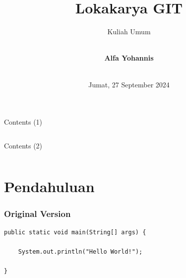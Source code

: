 \documentclass[aspectratio=169, table]{beamer}
\subtitle{Kuliah Umum}
\title{\LARGE{Lokakarya GIT}\\\vspace{10pt}}
\date[Serial]{\\\vspace{10pt}\scriptsize {Jumat, 27 September 2024}}
\author[Pradita]{\\\vspace{20pt}\small{\textbf{Alfa Yohannis}}}
\begin{document}
	
	\frame{\titlepage}
	
	\begin{frame}[fragile]{Contents (1)}
		\vspace{15pt}
		\begin{columns}[t]
			\begin{column}{.5\textwidth}
				\tableofcontents[sections={1-6}]
			\end{column}
			\begin{column}{.5\textwidth}
				\tableofcontents[sections={7-15}]
			\end{column}
		\end{columns}
	\end{frame}
	
	\begin{frame}[fragile]{Contents (2)}
		\vspace{15pt}
		\begin{columns}[t]
			\begin{column}{.5\textwidth}
				\tableofcontents[sections={16-24}]
			\end{column}
			\begin{column}{.5\textwidth}
				\tableofcontents[sections={25-50}]
			\end{column}
		\end{columns}
	\end{frame}
	
	\section{Pendahuluan}
	

\begin{frame}[fragile]
	\frametitle{Original Version}
	\begin{lstlisting}[style=java,basicstyle=\ttfamily]
public static void main(String[] args) {
	
	System.out.println("Hello World!");
	
}
	\end{lstlisting}
\end{frame}
\end{document}
